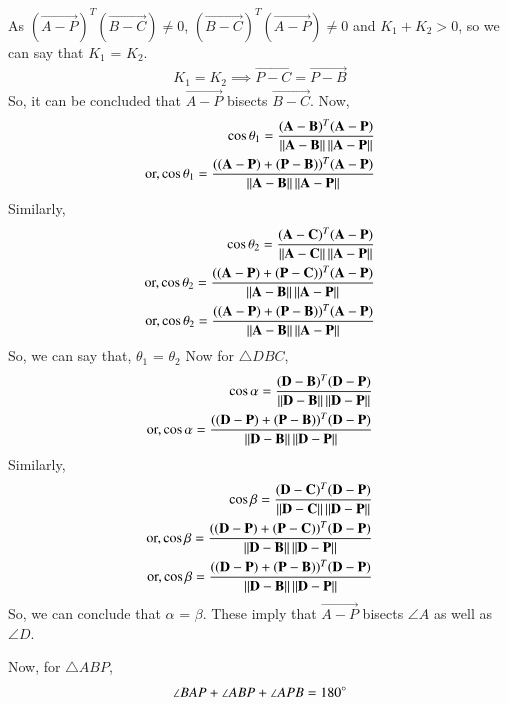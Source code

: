 \documentclass[journal,12pt,twocolumn]{IEEEtran}
\begin{document}
As $(\vec{A-P})^T (\vec{B-C}) \neq 0$, $(\vec{B-C})^T (\vec{A-P}) \neq 0$ and $K_1 + K_2 > 0$, so we can say that $K_1$ = $K_2$.
\begin{align}
K_1 = K_2
\implies \vec{P-C} = \vec{P-B}
\end{align}
So, it can be concluded that $\vec{A-P}$ bisects $\vec{B-C}$.
Now, 
\begin{align}
\cos\theta_1 = \frac{(\mathbf{A-B})^T (\mathbf{A-P})}{\left\lVert\mathbf{A-B}\right\rVert\left\lVert\mathbf{A-P}\right\rVert}\\
\text{or,}\cos\theta_1  = \frac{((\mathbf{A-P})+(\mathbf{P-B}))^T (\mathbf{A-P})}{\left\lVert\mathbf{A-B}\right\rVert\left\lVert\mathbf{A-P}\right\rVert}
\end{align}
Similarly,
\begin{align}
\cos\theta_2 = \frac{(\mathbf{A-C})^T (\mathbf{A-P})}{\left\lVert\mathbf{A-C}\right\rVert\left\lVert\mathbf{A-P}\right\rVert}\\
\text{or,}\cos\theta_2  = \frac{((\mathbf{A-P})+(\mathbf{P-C}))^T (\mathbf{A-P})}{\left\lVert\mathbf{A-B}\right\rVert\left\lVert\mathbf{A-P}\right\rVert}\\
\text{or,}\cos\theta_2  = \frac{((\mathbf{A-P})+(\mathbf{P-B}))^T (\mathbf{A-P})}{\left\lVert\mathbf{A-B}\right\rVert\left\lVert\mathbf{A-P}\right\rVert}
\end{align}
So, we can say that, $\theta_1$ = $\theta_2$
Now for $\triangle DBC$,
\begin{align}
\cos\alpha = \frac{(\mathbf{D-B})^T (\mathbf{D-P})}{\left\lVert\mathbf{D-B}\right\rVert\left\lVert\mathbf{D-P}\right\rVert}\\
\text{or,}\cos\alpha  = \frac{((\mathbf{D-P})+(\mathbf{P-B}))^T (\mathbf{D-P})}{\left\lVert\mathbf{D-B}\right\rVert\left\lVert\mathbf{D-P}\right\rVert}
\end{align}
Similarly,
\begin{align}
\cos\beta = \frac{(\mathbf{D-C})^T (\mathbf{D-P})}{\left\lVert\mathbf{D-C}\right\rVert\left\lVert\mathbf{D-P}\right\rVert}\\
\text{or,}\cos\beta = \frac{((\mathbf{D-P})+(\mathbf{P-C}))^T (\mathbf{D-P})}{\left\lVert\mathbf{D-B}\right\rVert\left\lVert\mathbf{D-P}\right\rVert}\\
\text{or,}\cos\beta  = \frac{((\mathbf{D-P})+(\mathbf{P-B}))^T (\mathbf{D-P})}{\left\lVert\mathbf{D-B}\right\rVert\left\lVert\mathbf{D-P}\right\rVert}
\end{align}
So, we can conclude that $\alpha$ = $\beta$.
These imply that $\vec{A-P}$ bisects $\angle A$ as well as $\angle D$.

Now, for $\triangle ABP$,
\begin{align}
\angle BAP + \angle ABP + \angle APB = 180 \degree
\end{align}
\end{document}
